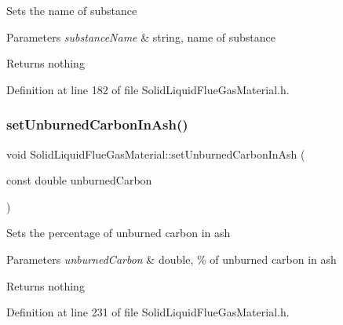 Sets the name of substance 
\begin{DoxyParams}{Parameters}
{\em substance\+Name} & string, name of substance \\
\hline
\end{DoxyParams}
\begin{DoxyReturn}{Returns}
nothing 
\end{DoxyReturn}


Definition at line 182 of file Solid\+Liquid\+Flue\+Gas\+Material.\+h.

\mbox{\label{class_solid_liquid_flue_gas_material_adf052dd1bdceeab710a4986b1fd874b9}} 
\subsubsection{\texorpdfstring{set\+Unburned\+Carbon\+In\+Ash()}{setUnburnedCarbonInAsh()}\hspace{0.1cm}{\footnotesize\ttfamily [1/3]}}
{\footnotesize\ttfamily void Solid\+Liquid\+Flue\+Gas\+Material\+::set\+Unburned\+Carbon\+In\+Ash (\begin{DoxyParamCaption}\item[{const double}]{unburned\+Carbon }\end{DoxyParamCaption})\hspace{0.3cm}{\ttfamily [inline]}}

Sets the percentage of unburned carbon in ash 
\begin{DoxyParams}{Parameters}
{\em unburned\+Carbon} & double, \% of unburned carbon in ash \\
\hline
\end{DoxyParams}
\begin{DoxyReturn}{Returns}
nothing 
\end{DoxyReturn}


Definition at line 231 of file Solid\+Liquid\+Flue\+Gas\+Material.\+h.

\mbox{\label{class_solid_liquid_flue_gas_material_adf052dd1bdceeab710a4986b1fd874b9}} 

